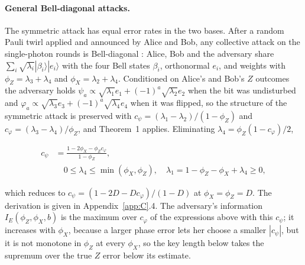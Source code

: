 \documentclass[aps,pra,twocolumn,superscriptaddress,nofootinbib]{revtex4-2}
\begin{document}
\paragraph*{General Bell-diagonal attacks.} The symmetric attack has equal error rates in the two bases. After a random Pauli twirl applied and announced by Alice and Bob, any collective attack on the single-photon rounds is Bell-diagonal \cite{KGR05}: Alice, Bob and the adversary share $\sum_i\sqrt{\lambda_i}|\beta_i\rangle|e_i\rangle$ with the four Bell states $\beta_i$, orthonormal $e_i$, and weights with $\phi_Z=\lambda_3+\lambda_4$ and $\phi_X=\lambda_2+\lambda_4$. Conditioned on Alice's and Bob's $Z$ outcomes the adversary holds $\psi_a\propto\sqrt{\lambda_1}e_1+(-1)^a\sqrt{\lambda_2}e_2$ when the bit was undisturbed and $\varphi_a\propto\sqrt{\lambda_3}e_3+(-1)^a\sqrt{\lambda_4}e_4$ when it was flipped, so the structure of the symmetric attack is preserved with $c_\psi=(\lambda_1-\lambda_2)/(1-\phi_Z)$ and $c_\varphi=(\lambda_3-\lambda_4)/\phi_Z$, and Theorem~1 applies. Eliminating $\lambda_4=\phi_Z(1-c_\varphi)/2$,

\begin{align}
c_\psi&=\frac{1-2\phi_X-\phi_Z c_\varphi}{1-\phi_Z},\\
&\quad 0\le\lambda_4\le\min(\phi_X,\phi_Z),\quad \lambda_1=1-\phi_Z-\phi_X+\lambda_4\ge0,\nonumber
\end{align}

which reduces to $c_\psi=(1-2D-Dc_\varphi)/(1-D)$ at $\phi_X=\phi_Z=D$. The derivation is given in Appendix~\ref{app:C}.4. The adversary's information $I_E(\phi_Z,\phi_X,b)$ is the maximum over $c_\varphi$ of the expressions above with this $c_\psi$; it increases with $\phi_X$, because a larger phase error lets her choose a smaller $|c_\psi|$, but it is not monotone in $\phi_Z$ at every $\phi_X$, so the key length below takes the supremum over the true $Z$ error below its estimate.
\end{document}
